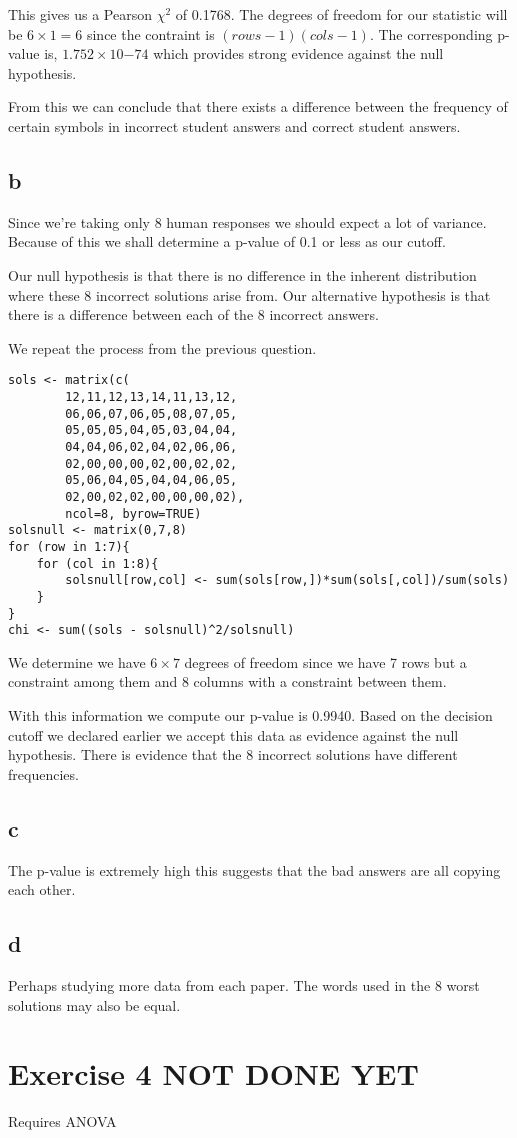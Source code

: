 \documentclass{article}
\begin{document}
This gives us a Pearson $\chi^2$ of 0.1768. The degrees of freedom for our
statistic will be $6 \times 1 = 6$ since the contraint is $(rows-1)(cols-1)$.
The corresponding p-value is, $1.752 \times 10{-74}$ which provides strong
evidence against the null hypothesis.

From this we can conclude that there exists a difference between the frequency
of certain symbols in incorrect student answers and correct student answers.

\subsection{b}
Since we're taking only 8 human responses we should expect a lot of variance.
Because of this we shall determine a p-value of 0.1 or less as our cutoff.

Our null hypothesis is that there is no difference in the inherent distribution
where these 8 incorrect solutions arise from. Our alternative hypothesis is that
there is a difference between each of the 8 incorrect answers.

We repeat the process from the previous question.
\begin{verbatim}
sols <- matrix(c(
        12,11,12,13,14,11,13,12,
        06,06,07,06,05,08,07,05,
        05,05,05,04,05,03,04,04,
        04,04,06,02,04,02,06,06,
        02,00,00,00,02,00,02,02,
        05,06,04,05,04,04,06,05,
        02,00,02,02,00,00,00,02),
        ncol=8, byrow=TRUE)
solsnull <- matrix(0,7,8)
for (row in 1:7){
    for (col in 1:8){
        solsnull[row,col] <- sum(sols[row,])*sum(sols[,col])/sum(sols)
    }
}
chi <- sum((sols - solsnull)^2/solsnull)
\end{verbatim}

We determine we have $6 \times 7$ degrees of freedom since we have 7 rows but a 
constraint among them and 8 columns with a constraint between them.

With this information we compute our p-value is 0.9940.
Based on the decision cutoff we declared earlier we accept this data as evidence
against the null hypothesis. There is evidence that the 8 incorrect solutions
have different frequencies.

\subsection{c}
The p-value is extremely high this suggests that the bad answers are all copying
each other.

\subsection{d}
Perhaps studying more data from each paper. The words used in the 8 worst
solutions may also be equal.


\section{Exercise 4 NOT DONE YET}
Requires ANOVA
\end{document}
